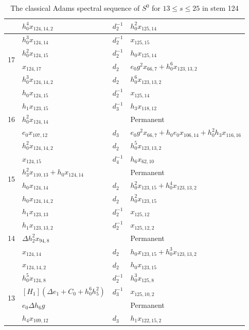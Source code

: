 \documentclass{amsart}
\numberwithin{equation}{section}
\begin{document}
\begin{table}
{\begin{tabular}{|c|l|l|l|}
 & $h_0^4x_{124,14,2}$ & $d_{2}^{-1}$ & $h_0^2x_{125,14}$ \\\hline\hline
\multirow{4}{*}{17} & $h_0^3x_{124,14}$ & $d_{2}^{-1}$ & $x_{125,15}$ \\\cline{2-4}
 & $h_0^2x_{124,15}$ & $d_{2}^{-1}$ & $h_0x_{125,14}$ \\\cline{2-4}
 & $x_{124,17}$ & $d_{2}$ & $e_0g^2x_{66,7}+h_0^6x_{123,13,2}$ \\\cline{2-4}
 & $h_0^3x_{124,14,2}$ & $d_{2}$ & $h_0^6x_{123,13,2}$ \\\hline\hline
\multirow{5}{*}{16} & $h_0x_{124,15}$ & $d_{2}^{-1}$ & $x_{125,14}$ \\\cline{2-4}
 & $h_1x_{123,15}$ & $d_{3}^{-1}$ & $h_3x_{118,12}$ \\\cline{2-4}
 & $h_0^2x_{124,14}$ & & Permanent \\\cline{2-4}
 & $e_0x_{107,12}$ & $d_{3}$ & $e_0g^2x_{66,7}+h_0e_0x_{106,14}+h_0^2h_3x_{116,16}$ \\\cline{2-4}
 & $h_0^2x_{124,14,2}$ & $d_{2}$ & $h_0^5x_{123,13,2}$ \\\hline\hline
\multirow{4}{*}{15} & $x_{124,15}$ & $d_{4}^{-1}$ & $h_6x_{62,10}$ \\\cline{2-4}
 & $h_3^2x_{110,13}+h_0x_{124,14}$ & & Permanent \\\cline{2-4}
 & $h_0x_{124,14}$ & $d_{2}$ & $h_0^2x_{123,15}+h_0^4x_{123,13,2}$ \\\cline{2-4}
 & $h_0x_{124,14,2}$ & $d_{2}$ & $h_0^2x_{123,15}$ \\\hline\hline
\multirow{5}{*}{14} & $h_1x_{123,13}$ & $d_{2}^{-1}$ & $x_{125,12}$ \\\cline{2-4}
 & $h_1x_{123,13,2}$ & $d_{2}^{-1}$ & $x_{125,12,2}$ \\\cline{2-4}
 & $\Delta h_2^2x_{94,8}$ & & Permanent \\\cline{2-4}
 & $x_{124,14}$ & $d_{2}$ & $h_0x_{123,15}+h_0^3x_{123,13,2}$ \\\cline{2-4}
 & $x_{124,14,2}$ & $d_{2}$ & $h_0x_{123,15}$ \\\hline\hline
\multirow{4}{*}{13} & $h_0^5x_{124,8}$ & $d_{2}^{-1}$ & $h_0^3x_{125,8}$ \\\cline{2-4}
 & $[H_1](\Delta e_1+C_0+h_0^6h_5^2)$ & $d_{3}^{-1}$ & $x_{125,10,2}$ \\\cline{2-4}
 & $e_0\Delta h_6g$ & & Permanent \\\cline{2-4}
 & $h_4x_{109,12}$ & $d_{3}$ & $h_1x_{122,15,2}$ \\\hline
\end{tabular}}
\caption{The classical Adams spectral sequence of $S^0$ for $13 \le s \le 25$ in stem 124}
\label{Table:S124.13}
\end{table}
\end{document}
